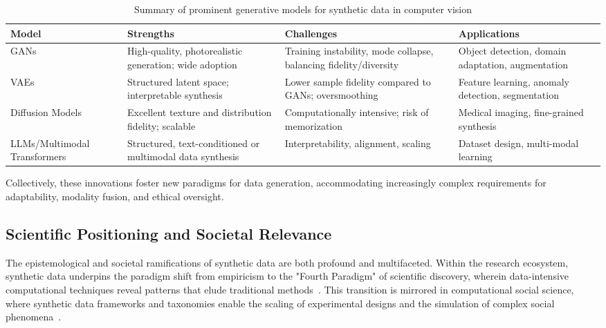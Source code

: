 \documentclass[sigconf]{acmart}
\begin{document}
\begin{table*}[htbp]
\centering
\caption{Summary of prominent generative models for synthetic data in computer vision}
\label{tab:gen_model_summary}
\begin{adjustbox}{max width=\textwidth}
\begin{tabular}{llll}
\toprule
\textbf{Model} & \textbf{Strengths} & \textbf{Challenges} & \textbf{Applications} \\
\midrule
GANs & High-quality, photorealistic generation; wide adoption & Training instability, mode collapse, balancing fidelity/diversity & Object detection, domain adaptation, augmentation \\
VAEs & Structured latent space; interpretable synthesis & Lower sample fidelity compared to GANs; oversmoothing & Feature learning, anomaly detection, segmentation \\
Diffusion Models & Excellent texture and distribution fidelity; scalable & Computationally intensive; risk of memorization & Medical imaging, fine-grained synthesis \\
LLMs/Multimodal Transformers & Structured, text-conditioned or multimodal data synthesis & Interpretability, alignment, scaling & Dataset design, multi-modal learning \\
\bottomrule
\end{tabular}
\end{adjustbox}
\end{table*}

Collectively, these innovations foster new paradigms for data generation, accommodating increasingly complex requirements for adaptability, modality fusion, and ethical oversight.

\subsection{Scientific Positioning and Societal Relevance}

The epistemological and societal ramifications of synthetic data are both profound and multifaceted. Within the research ecosystem, synthetic data underpins the paradigm shift from empiricism to the "Fourth Paradigm" of scientific discovery, wherein data-intensive computational techniques reveal patterns that elude traditional methods~\cite{ref13,ref14,ref33}. This transition is mirrored in computational social science, where synthetic data frameworks and taxonomies enable the scaling of experimental designs and the simulation of complex social phenomena~\cite{ref14,ref22,ref87}.
\end{document}
